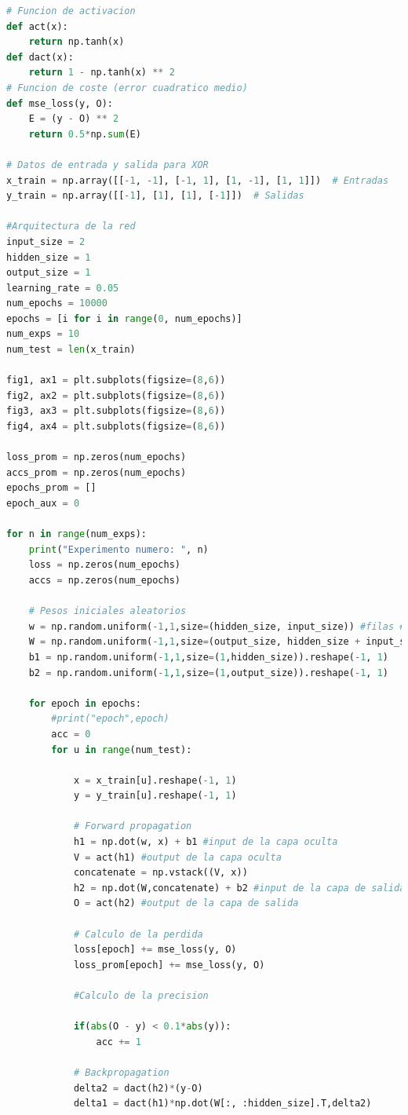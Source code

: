 \documentclass[11pt,twocolumn,twoside]{opticajnl}
\begin{document}
\begin{onecolumn}
\begin{lstlisting}[language=Python, caption={Ejercicio 1 - Arquitectura 2-1-1}, label=ej1b]
# Funcion de activacion
def act(x):
    return np.tanh(x)
def dact(x):
    return 1 - np.tanh(x) ** 2
# Funcion de coste (error cuadratico medio)
def mse_loss(y, O):
    E = (y - O) ** 2
    return 0.5*np.sum(E)

# Datos de entrada y salida para XOR
x_train = np.array([[-1, -1], [-1, 1], [1, -1], [1, 1]])  # Entradas
y_train = np.array([[-1], [1], [1], [-1]])  # Salidas

#Arquitectura de la red
input_size = 2
hidden_size = 1
output_size = 1
learning_rate = 0.05
num_epochs = 10000
epochs = [i for i in range(0, num_epochs)]
num_exps = 10
num_test = len(x_train)

fig1, ax1 = plt.subplots(figsize=(8,6)) 
fig2, ax2 = plt.subplots(figsize=(8,6)) 
fig3, ax3 = plt.subplots(figsize=(8,6)) 
fig4, ax4 = plt.subplots(figsize=(8,6)) 

loss_prom = np.zeros(num_epochs)
accs_prom = np.zeros(num_epochs)
epochs_prom = []
epoch_aux = 0

for n in range(num_exps):
    print("Experimento numero: ", n)
    loss = np.zeros(num_epochs)
    accs = np.zeros(num_epochs)

    # Pesos iniciales aleatorios
    w = np.random.uniform(-1,1,size=(hidden_size, input_size)) #filas #columnas
    W = np.random.uniform(-1,1,size=(output_size, hidden_size + input_size))
    b1 = np.random.uniform(-1,1,size=(1,hidden_size)).reshape(-1, 1) 
    b2 = np.random.uniform(-1,1,size=(1,output_size)).reshape(-1, 1) 

    for epoch in epochs:
        #print("epoch",epoch)
        acc = 0  
        for u in range(num_test):

            x = x_train[u].reshape(-1, 1)
            y = y_train[u].reshape(-1, 1)

            # Forward propagation
            h1 = np.dot(w, x) + b1 #input de la capa oculta
            V = act(h1) #output de la capa oculta
            concatenate = np.vstack((V, x)) 
            h2 = np.dot(W,concatenate) + b2 #input de la capa de salida
            O = act(h2) #output de la capa de salida

            # Calculo de la perdida
            loss[epoch] += mse_loss(y, O)
            loss_prom[epoch] += mse_loss(y, O)

            #Calculo de la precision 
    
            if(abs(O - y) < 0.1*abs(y)):
                acc += 1

            # Backpropagation
            delta2 = dact(h2)*(y-O)
            delta1 = dact(h1)*np.dot(W[:, :hidden_size].T,delta2)


\end{lstlisting}
\end{onecolumn}
\end{document}
